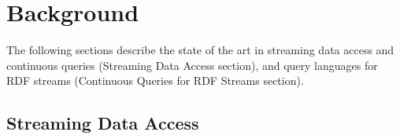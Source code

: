 \section{Background}\label{previousworks}


The following sections describe the state of the art in streaming data access and continuous queries (Streaming Data Access section), %
 and query languages for RDF streams (Continuous Queries for RDF Streams section). %
%
%
\subsection{Streaming Data Access}
\label{datastreams}


